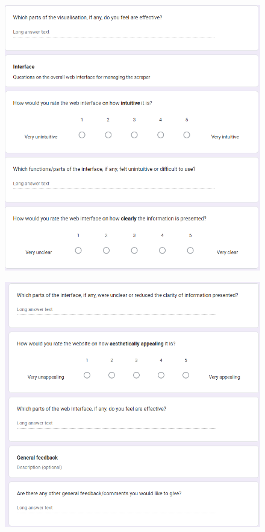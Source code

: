\documentclass{l4proj}
\begin{document}
\begin{appendices}
 \begin{figure}[h]
\centering
\includegraphics[width=\textwidth]{images/Form5.png}
\end{figure}

 \begin{figure}[h]
\centering
\includegraphics[width=\textwidth]{images/Form6.png}
\end{figure}

\end{appendices}



\end{document}
